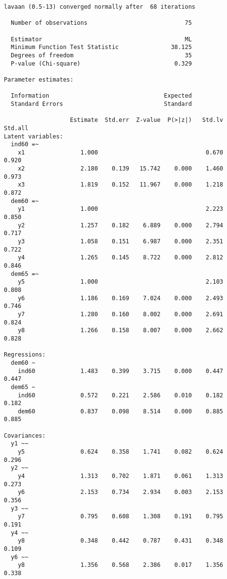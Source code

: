 \begin{verbatim}
lavaan (0.5-13) converged normally after  68 iterations

  Number of observations                            75

  Estimator                                         ML
  Minimum Function Test Statistic               38.125
  Degrees of freedom                                35
  P-value (Chi-square)                           0.329

Parameter estimates:

  Information                                 Expected
  Standard Errors                             Standard

                   Estimate  Std.err  Z-value  P(>|z|)   Std.lv  Std.all
Latent variables:
  ind60 =~
    x1                1.000                               0.670    0.920
    x2                2.180    0.139   15.742    0.000    1.460    0.973
    x3                1.819    0.152   11.967    0.000    1.218    0.872
  dem60 =~
    y1                1.000                               2.223    0.850
    y2                1.257    0.182    6.889    0.000    2.794    0.717
    y3                1.058    0.151    6.987    0.000    2.351    0.722
    y4                1.265    0.145    8.722    0.000    2.812    0.846
  dem65 =~
    y5                1.000                               2.103    0.808
    y6                1.186    0.169    7.024    0.000    2.493    0.746
    y7                1.280    0.160    8.002    0.000    2.691    0.824
    y8                1.266    0.158    8.007    0.000    2.662    0.828

Regressions:
  dem60 ~
    ind60             1.483    0.399    3.715    0.000    0.447    0.447
  dem65 ~
    ind60             0.572    0.221    2.586    0.010    0.182    0.182
    dem60             0.837    0.098    8.514    0.000    0.885    0.885

Covariances:
  y1 ~~
    y5                0.624    0.358    1.741    0.082    0.624    0.296
  y2 ~~
    y4                1.313    0.702    1.871    0.061    1.313    0.273
    y6                2.153    0.734    2.934    0.003    2.153    0.356
  y3 ~~
    y7                0.795    0.608    1.308    0.191    0.795    0.191
  y4 ~~
    y8                0.348    0.442    0.787    0.431    0.348    0.109
  y6 ~~
    y8                1.356    0.568    2.386    0.017    1.356    0.338


\end{verbatim}
